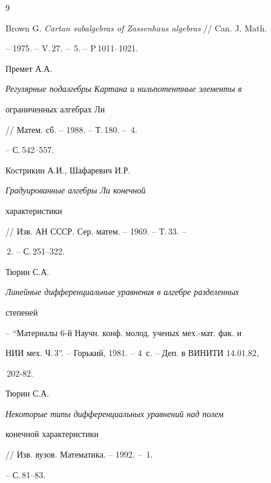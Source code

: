  


\begin{thebibliography}{9}  


 




Brown G. {\em Cartan subalgebras of Zassenhaus algebras} // Can. J. Math. 


-- 1975. -- V.\,27. -- \No\,5. -- P\,1011--1021. 




Премет А.А. {\em Регулярные подалгебры Картана и нильпотентные элементы в 


ограниченных алгебрах Ли} // Матем. сб. -- 1988. -- Т.\,180. -- \No\,4. 


-- С.\,542--557. 




Кострикин А.И., Шафаревич И.Р. {\em Градуированные алгебры Ли конечной 


характеристики} // Изв. АН СССР. Сер. матем. -- 1969. -- Т.\,33. -- 


\No\,2. -- С.\,251--322. 




Тюрин С.А. {\em Линейные дифференциальные уравнения в алгебре разделенных 


степеней} -- ``Материалы 6-й Научн. конф. молод. ученых мех.-мат. фак. и 


НИИ мех. Ч.\,3''. -- Горький, 1981. -- 4~с. -- Деп. в ВИНИТИ 14.01.82, 


\No\,202-82. 




Тюрин С.А. {\em Некоторые типы дифференциальных уравнений над полем 


конечной характеристики} // Изв. вузов. Математика. -- 1992. -- \No\,1. 


-- С.\,81--83. 


 


\end{thebibliography}  


  


\vskip 2cm  


  






 


  


